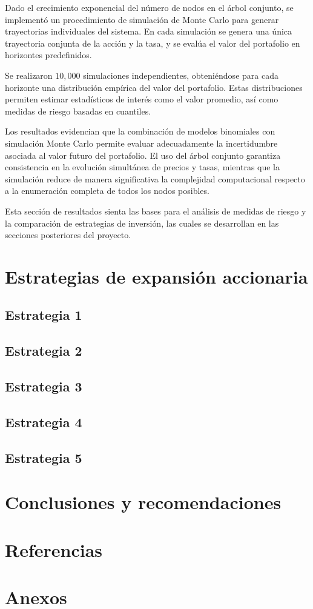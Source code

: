 \documentclass[12pt, a4paper]{article}
\begin{document}
Dado el crecimiento exponencial del número de nodos en el árbol conjunto, se implementó un procedimiento de simulación de Monte Carlo para generar trayectorias individuales del sistema. En cada simulación se genera una única trayectoria conjunta de la acción y la tasa, y se evalúa el valor del portafolio en horizontes predefinidos.

Se realizaron \(10{,}000\) simulaciones independientes, obteniéndose para cada horizonte una distribución empírica del valor del portafolio. Estas distribuciones permiten estimar estadísticos de interés como el valor promedio, así como medidas de riesgo basadas en cuantiles.

Los resultados evidencian que la combinación de modelos binomiales con simulación Monte Carlo permite evaluar adecuadamente la incertidumbre asociada al valor futuro del portafolio. El uso del árbol conjunto garantiza consistencia en la evolución simultánea de precios y tasas, mientras que la simulación reduce de manera significativa la complejidad computacional respecto a la enumeración completa de todos los nodos posibles.

Esta sección de resultados sienta las bases para el análisis de medidas de riesgo y la comparación de estrategias de inversión, las cuales se desarrollan en las secciones posteriores del proyecto.


\section{Estrategias de expansión accionaria}

\subsection{Estrategia 1}

\subsection{Estrategia 2}

\subsection{Estrategia 3}

\subsection{Estrategia 4}

\subsection{Estrategia 5}

\section{Conclusiones y recomendaciones}

\section*{Referencias}

\appendix
\section{Anexos}
\end{document}
